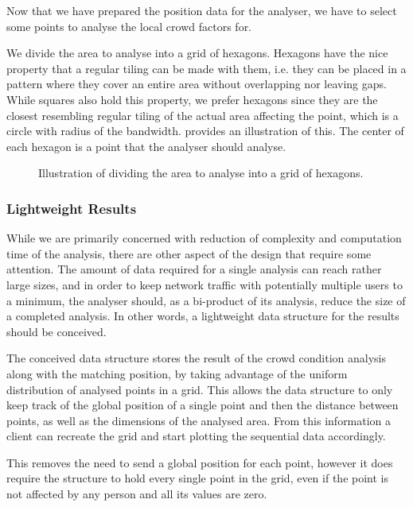 Now that we have prepared the position data for the analyser, we have to select some points to analyse the local crowd factors for.

We divide the area to analyse into a grid of hexagons. Hexagons have the nice property that a regular tiling can be made with them, i.e. they can be placed in a pattern where they cover an entire area without overlapping nor leaving gaps. While squares also hold this property, we prefer hexagons since they are the closest resembling regular tiling of the actual area affecting the point, which is a circle with radius of the bandwidth.  provides an illustration of this. The center of each hexagon is a point that the analyser should analyse.

\begin{figure}
\centering
{}
\caption{Illustration of dividing the area to analyse into a grid of hexagons.}\label{fig:analysis_hexagon_divide}
\end{figure}


\subsubsection{Lightweight Results}

While we are primarily concerned with reduction of complexity and computation time of the analysis, there are other aspect of the design that require some attention. The amount of data required for a single analysis can reach rather large sizes, and in order to keep network traffic with potentially multiple users to a minimum, the analyser should, as a bi-product of its analysis, reduce the size of a completed analysis. In other words, a lightweight data structure for the results should be conceived. 

The conceived data structure stores the result of the crowd condition analysis along with the matching position, by taking advantage of the uniform distribution of analysed points in a grid. This allows the data structure to only keep track of the global position of a single point and then the distance between points, as well as the dimensions of the analysed area. From this information a client can recreate the grid and start plotting the sequential data accordingly.

This removes the need to send a global position for each point, however it does require the structure to hold every single point in the grid, even if the point is not affected by any person and all its values are zero.






